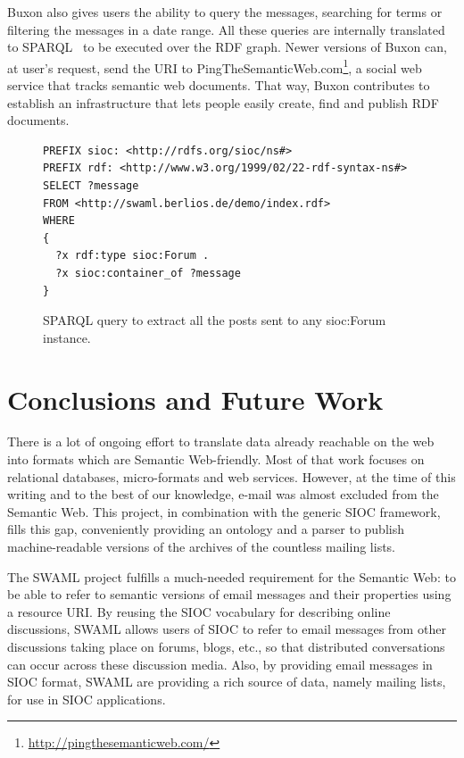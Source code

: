 \documentclass{llncs}
\begin{document}
Buxon also gives users the ability to query the messages, searching
for terms or filtering the messages in a date range. All these queries
are internally translated to SPARQL~\cite{SPARQLProtocol} to be executed
over the RDF graph. Newer versions of Buxon can, at user's request, send 
the URI to PingTheSemanticWeb.com\footnote{\url{http://pingthesemanticweb.com/}}, 
a social web service that tracks semantic web documents. That way, Buxon
contributes to establish an infrastructure that lets people easily create, 
find and publish RDF documents.

\begin{figure}[ht]
\lstset{language=SPARQL}
\begin{lstlisting}
PREFIX sioc: <http://rdfs.org/sioc/ns#>
PREFIX rdf: <http://www.w3.org/1999/02/22-rdf-syntax-ns#>
SELECT ?message
FROM <http://swaml.berlios.de/demo/index.rdf>
WHERE
{
  ?x rdf:type sioc:Forum .
  ?x sioc:container_of ?message
}
\end{lstlisting}
\caption{SPARQL query to extract all the posts sent to any \textsf{sioc:Forum} instance.}
\label{fig:sparqlquery}
\end{figure}

\section{\label{sec:conclusions}Conclusions and Future Work}

There is a lot of ongoing effort to translate data already reachable
on the web into formats which are Semantic Web-friendly. Most of that 
work focuses on relational databases, micro-formats and web services. 
However, at the time of this writing and to the best of our knowledge, 
e-mail was almost excluded from the Semantic Web. This project, in 
combination with the generic SIOC framework, fills this gap, conveniently 
providing an ontology and a parser to publish machine-readable versions 
of the archives of the countless mailing lists.

The SWAML project fulfills a much-needed requirement for the Semantic Web: 
to be able to refer to semantic versions of email messages and their 
properties using a resource URI. By reusing the SIOC vocabulary for describing
online discussions, SWAML allows users of SIOC to refer to email messages 
from other discussions taking place on forums, blogs, etc., so that distributed 
conversations can occur across these discussion media. Also, by providing email 
messages in SIOC format, SWAML are providing a rich source of data, namely 
mailing lists, for use in SIOC applications.
\end{document}
